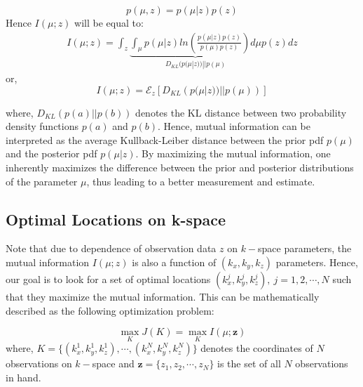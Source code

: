 \documentclass{article}         %
\theoremstyle{definition}
\theoremstyle{remark}
\begin{document}
\[p(\mu,z)=p(\mu|z)p(z)\]
Hence $I(\mu;z)$ will be equal to:
\begin{eqnarray}\label{info}
I(\mu;z) = \int_{z} \underbrace{\int_{\mu} p(\mu|z)ln\left(\frac{p(\mu|z)p(z)}{p(\mu)p(z)}\right)d\mu}_{D_{KL}(p(\mu|z))||p(\mu)} p(z) dz
\end{eqnarray}
or,
\begin{equation}
I(\mu;z)=\mathcal{E}_z[D_{KL}\left(p(\mu|z))||p(\mu)\right)]
\end{equation}
  
where, $D_{KL}\left(p(a)||p(b)\right)$ denotes the KL distance between two probability density functions $p(a)$  and $p(b)$. Hence, mutual information can be interpreted as the average Kullback-Leiber distance between the prior pdf $p(\mu)$ and the posterior pdf $p(\mu|z)$. By maximizing the mutual information, one inherently maximizes the difference between the prior and posterior distributions of the parameter $\mu$, thus leading to a better measurement and estimate.


\subsection{Optimal Locations on k-space}\label{subsec:kspace}
Note that due to dependence of observation data $z$ on $k-$space parameters, the mutual information $I(\mu;z)$ is also a function of $(k_x,k_y,k_z)$ parameters. Hence, our goal is to look for a set of optimal locations $(k_x^j,k_y^j,k_z^j),\ j=1,2,\cdots,N$ such that they maximize the mutual information. This can be mathematically described as the following optimization problem:

\begin{equation}\label{cost1}
\max_K J(K) = \max_{K} I(\mu;\mathbf{z})
\end{equation}
where, $K=\{(k_x^1,k_y^1,k_z^1),\cdots,(k_x^N,k_y^N,k_z^N)\}$ denotes the coordinates of $N$ observations on $k-$space and $\mathbf{z}=\{z_1,z_2,\cdots,z_N\}$ is the set of all $N$ observations in hand. 
\end{document}
